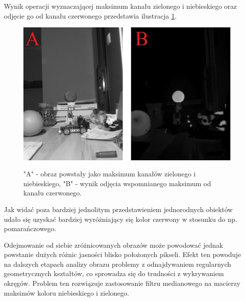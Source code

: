 Wynik operacji wyznaczającej maksimum kanału zielonego i niebieskiego oraz odjęcie go od kanału czerwonego przedstawia ilustracja \ref{red-max}.\newpage
\begin{figure}[H]
\begin{center}
\includegraphics[scale=0.42]{imgs/imgMax+RwoBG.jpg}
\caption[Kanał czerwony minus maksimum zielonego i niebieskiego.]\small{"A" - obraz powstały jako maksimum kanałów zielonego i niebieskiego, "B" - wynik odjęcia wspomnianego maksimum od kanału czerwonego.}
\label{red-max}
\end{center}
\end{figure}
Jak widać poza bardziej jednolitym przedstawieniem jednorodnych obiektów udało się uzyskać bardziej wyróżniający się kolor czerwony w stosunku do np. pomarańczowego.

Odejmowanie od siebie zróżnicowanych obrazów może powodować jednak powstanie dużych różnic jasności blisko położonych pikseli.  Efekt ten powoduje na dalszych etapach analizy obrazu problemy z odnajdywaniem regularnych geometrycznych kształtów, co sprowadza się do trudności z wykrywaniem okręgów. Problem ten rozwiązuje zastosowanie filtru medianowego na macierzy maksimów koloru niebieskiego i zielonego.

